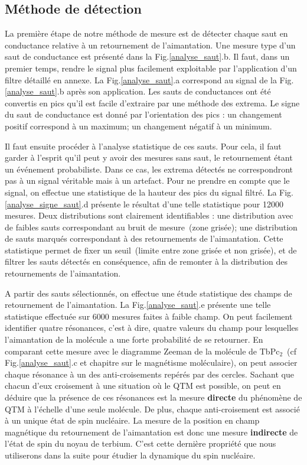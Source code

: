 \subsection{Méthode de détection}
La première étape de notre méthode de mesure est de détecter chaque saut en conductance relative à un retournement de l'aimantation. Une mesure type d'un saut de conductance est présenté dans la Fig.\ref{analyse_saut}.b. Il faut, dans un premier temps, rendre le signal plus facilement exploitable par l'application d'un filtre détaillé en annexe. La Fig.\ref{analyse_saut}.a correspond au signal de la Fig.\ref{analyse_saut}.b après son application. Les sauts de conductances ont été convertis en pics qu'il est facile d'extraire par une méthode des extrema. Le signe du saut de conductance est donné par l'orientation des pics : un changement positif correspond à un maximum; un changement négatif à un minimum.

Il faut ensuite procéder à l'analyse statistique de ces sauts. Pour cela, il faut garder à l'esprit qu'il peut y avoir des mesures sans saut, le retournement étant un événement probabiliste. Dans ce cas, les extrema détectés ne correspondront pas à un signal véritable mais à un artefact. Pour ne prendre en compte que le signal, on effectue une statistique de la hauteur des pics du signal filtré. La Fig.\ref{analyse_signe_saut}.d présente le résultat d'une telle statistique pour 12000 mesures. Deux distributions sont clairement identifiables : une distribution avec de faibles sauts correspondant au bruit de mesure~(zone grisée); une distribution de sauts marqués correspondant à des retournements de l'aimantation. Cette statistique permet de fixer un seuil~(limite entre zone grisée et non grisée), et de filtrer les sauts détectés en conséquence, afin de remonter à la distribution des retournements de l'aimantation.

A partir des sauts sélectionnés, on effectue une étude statistique des champs de retournement de l'aimantation. La Fig.\ref{analyse_saut}.e présente une telle statistique effectuée sur 6000 mesures faites à faible champ. On peut facilement identifier quatre résonances, c'est à dire, quatre valeurs du champ pour lesquelles l'aimantation de la molécule a une forte probabilité de se retourner. En comparant cette mesure avec le diagramme Zeeman de la molécule de TbPc$_2$~(cf Fig.\ref{analyse_saut}.c et chapitre sur le magnétisme moléculaire), on peut associer chaque résonance à un des anti-croisements repérés par des cercles. Sachant que chacun d'eux croisement à une situation où le QTM est possible, on peut en déduire que la présence de ces résonances est la mesure \textbf{directe} du phénomène de QTM à l'échelle d'une seule molécule. De plus, chaque anti-croisement est associé à un unique état de spin nucléaire. La mesure de la position en champ magnétique du retournement de l'aimantation est donc une mesure \textbf{indirecte} de l'état de spin du noyau de terbium. C'est cette dernière propriété que nous utiliserons dans la suite pour étudier la dynamique du spin nucléaire.


